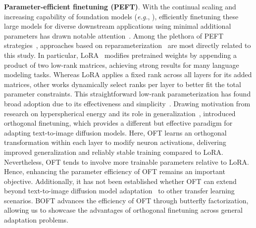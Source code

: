 \textbf{Parameter-efficient finetuning (PEFT)}. With the continual scaling and increasing capability of foundation models (\emph{e.g.}, \cite{brown2020language,radford2021learning,rombach2022high,kirillov2023segment}), efficiently finetuning these large models for diverse downstream applications using minimal additional parameters has drawn notable attention~\cite{treviso2023efficient,ding2023parameter,lialin2023scaling}. Among the plethora of PEFT strategies~\cite{houlsby2019parameter,aghajanyan2020intrinsic,hulora2022,edalati2022krona,wang2022adamix,gheini2021cross,zaken2022bitfit,guo2020parameter,sung2021training,ansell2022composable,lester2021power,li2021prefix,vu2022spot,he2021towards,mao2021unipelt,karimi2021compacter,liu2022few,sung2022lst,chen2022parameter,jia2022visual,chen2022adaptformer,zhang2022neural,jie2023fact,lian2022scaling,luo2023towards}, approaches based on reparameterization~\cite{aghajanyan2020intrinsic,hulora2022,edalati2022krona} are most directly related to this study. In particular, LoRA~\cite{hulora2022} modifies pretrained weights by appending a product of two low-rank matrices, achieving strong results for many language modeling tasks. Whereas LoRA applies a fixed rank across all layers for its added matrices, other works \cite{zhang2022adaptive,valipour2022dylora,zhang2023increlora} dynamically select ranks per layer to better fit the total parameter constraints. This straightforward low-rank parameterization has found broad adoption due to its effectiveness and simplicity~\cite{dettmers2023qlora,zi2023delta,chavan2023one}. Drawing motivation from research on hyperspherical energy and its role in generalization~\cite{liu2018learning,liu2021orthogonal}, \cite{qiu2023controlling} introduced orthogonal finetuning, which provides a different but effective paradigm for adapting text-to-image diffusion models. Here, OFT learns an orthogonal transformation within each layer to modify neuron activations, delivering improved generalization and reliably stable training compared to LoRA. Nevertheless, OFT tends to involve more trainable parameters relative to LoRA. Hence, enhancing the parameter efficiency of OFT remains an important objective. Additionally, it has not been established whether OFT can extend beyond text-to-image diffusion model adaptation~\cite{qiu2023controlling} to other transfer learning scenarios. BOFT advances the efficiency of OFT through butterfly factorization, allowing us to showcase the advantages of orthogonal finetuning across general adaptation problems.

